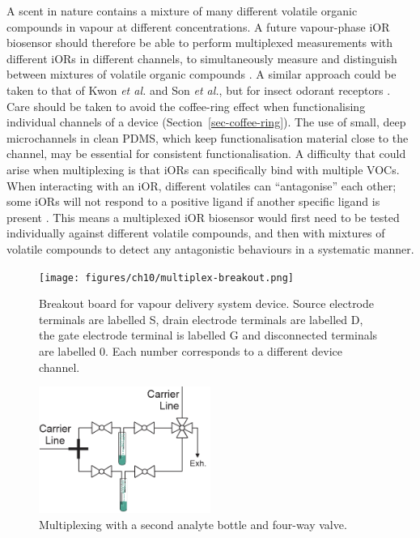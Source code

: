 \documentclass[
  a4paper,
]{scrbook}
\begin{document}
A scent in nature contains a mixture of many different volatile organic
compounds in vapour at different concentrations. A future vapour-phase
iOR biosensor should therefore be able to perform multiplexed
measurements with different iORs in different channels, to
simultaneously measure and distinguish between mixtures of volatile
organic compounds \autocite{Kwon2015,Bachtiar2016,Hurot2020,Hirata2021}.
A similar approach could be taken to that of Kwon \emph{et al.} and Son
\emph{et al.}, but for insect odorant receptors
\autocite{Kwon2015,Son2017}. Care should be taken to avoid the
coffee-ring effect when functionalising individual channels of a device
(Section~\ref{sec-coffee-ring}). The use of small, deep microchannels in
clean PDMS, which keep functionalisation material close to the channel,
may be essential for consistent functionalisation. A difficulty that
could arise when multiplexing is that iORs can specifically bind with
multiple VOCs. When interacting with an iOR, different volatiles can
``antagonise'' each other; some iORs will not respond to a positive
ligand if another specific ligand is present
\autocite{Kwon2015,Son2017,Munch2016,Hirata2021}. This means a
multiplexed iOR biosensor would first need to be tested individually
against different volatile compounds, and then with mixtures of volatile
compounds to detect any antagonistic behaviours in a systematic manner.

\begin{figure}

{\centering \texttt{[image: figures/ch10/multiplex-breakout.png]}

}

\caption[Breakout board for vapour delivery system
device.]{\label{fig-vapour-sensor-breakout}Breakout board for vapour
delivery system device. Source electrode terminals are labelled S, drain
electrode terminals are labelled D, the gate electrode terminal is
labelled G and disconnected terminals are labelled 0. Each number
corresponds to a different device channel.}

\end{figure}

\begin{figure}

{\centering \includegraphics[width=0.5\textwidth,height=\textheight]{figures/ch10/multiplex-vapoursensor.png}

}

\caption[Multiplexing with a second analyte bottle and four-way
valve.]{\label{fig-vapour-sensor-multiplexing}Multiplexing with a second
analyte bottle and four-way valve.}

\end{figure}
\end{document}
